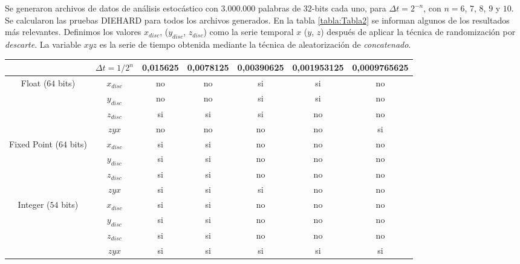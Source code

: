 Se generaron archivos de datos de análisis estocástico con $3.000.000$ palabras de $32$-bits cada uno, para $\Delta t = 2^{-n}$, con $n = 6$, $7$, $8$, $9$ y $10$.
Se calcularon las pruebas DIEHARD para todos los archivos generados.
En la tabla \ref{tabla:Tabla2} se informan algunos de los resultados más relevantes.
Definimos los valores $x_ {disc}$, ($ y_{disc}$, $z_{disc}$) como la serie temporal $x$ ($ y $, $ z $) después de aplicar la técnica de randomización por \textit{descarte}.
La variable $xyz$ es la serie de tiempo obtenida mediante la técnica de aleatorización de \textit{concatenado}.
\begin{table*} [tb]
\begin{center}
\caption{DIEHARD tests results.}
\begin{tabular}{|c|c|c|c|c|c|c|}
	\hline\hline
	                        & $\Delta t=1/2^n$ & 0,015625 & 0,0078125 & 0,00390625 & 0,001953125 & 0,0009765625 \\ \hline\hline
	   Float ($64$ bits)    &    $x_{disc}$    &    no    &    no     &     si     &     si      &      no      \\ \hline
	                        &    $y_{disc}$    &    no    &    no     &     si     &     si      &      no      \\ \hline
	                        &    $z_{disc}$    &    si    &    si     &     si     &     no      &      no      \\ \hline
	                        &      $zyx$       &    no    &    no     &     no     &     no      &      si      \\ \hline\hline
	Fixed Point ($64$ bits) &    $x_{disc}$    &    si    &    si     &     no     &     no      &      no      \\ \hline
	                        &    $y_{disc}$    &    si    &    si     &     no     &     no      &      no      \\ \hline
	                        &    $z_{disc}$    &    si    &    si     &     no     &     no      &      no      \\ \hline
	                        &      $zyx$       &    si    &    si     &     si     &     no      &      no      \\ \hline\hline
	  Integer ($54$ bits)   &    $x_{disc}$    &    si    &    si     &     no     &     no      &      no      \\ \hline
	                        &    $y_{disc}$    &    si    &    si     &     no     &     no      &      no      \\ \hline
	                        &    $z_{disc}$    &    si    &    si     &     no     &     no      &      no      \\ \hline
	                        &      $zyx$       &    si    &    si     &     si     &     si      &      si      \\ \hline
\end{tabular}
\end{center}
\label{tabla:Tabla2}
\end{table*}

